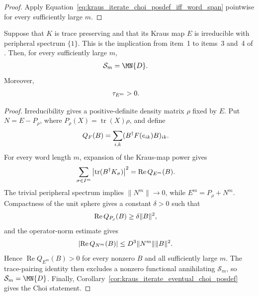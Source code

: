 \begin{proof}
    \leanok
    Apply
    Equation~\eqref{eq:kraus_iterate_choi_posdef_iff_word_span} pointwise for
    every sufficiently large $m$.
\end{proof}

\begin{theorem}
    \label{thm:kraus_primitive_irreducible_eventual_span_choi}
    \leanok
    Suppose that $K$ is trace preserving and that its Kraus map $E$ is
    irreducible with peripheral spectrum $\{1\}$. This is the implication from
    item~1 to items~3 and~4 of
    \cite[Theorem~6.8(1,3,4)]{Wolf2012Quantum}. Then, for every sufficiently
    large $m$,
    \begin{align}
        \mathcal S_m&=\MN{D}.
        \notag
    \end{align}
    Moreover,
    \begin{align}
        \tau_{E^m}&>0.
        \notag
    \end{align}
\end{theorem}

\begin{proof}
    \leanok
    Irreducibility gives a positive-definite density matrix $\rho$ fixed by
    $E$. Put $N=E-P_\rho$, where
    $P_\rho(X)=\operatorname{tr}(X)\rho$, and define
    \begin{align}
        Q_F(B)&=\sum_{i,k}(B^\dagger F(e_{ik})B)_{ik}.
        \notag
    \end{align}
    For every word length $m$, expansion of the Kraus-map power gives
    \begin{align}
        \sum_{\sigma\in I^m}
        \left|\operatorname{tr}(B^\dagger K_\sigma)\right|^2
        &=\operatorname{Re}Q_{E^m}(B).
        \notag
    \end{align}
    The trivial peripheral spectrum implies $\lVert N^m\rVert\to0$, while
    $E^m=P_\rho+N^m$. Compactness of the unit sphere gives a constant
    $\delta>0$ such that
    \begin{align}
        \operatorname{Re}Q_{P_\rho}(B)&\geq
        \delta\lVert B\rVert^2,
        \notag
    \end{align}
    and the operator-norm estimate gives
    \begin{align}
        \left|\operatorname{Re}Q_{N^m}(B)\right|&\leq
        D^3\lVert N^m\rVert\lVert B\rVert^2.
        \notag
    \end{align}
    Hence $\operatorname{Re}Q_{E^m}(B)>0$ for every nonzero $B$ and all
    sufficiently large $m$. The trace-pairing identity then excludes a
    nonzero functional annihilating $\mathcal S_m$, so
    $\mathcal S_m=\MN{D}$. Finally,
    Corollary~\ref{cor:kraus_iterate_eventual_choi_posdef} gives the Choi
    statement.
\end{proof}

